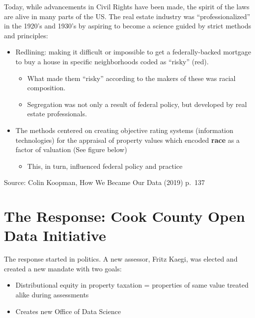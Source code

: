 \documentclass[
  letterpaper,
  DIV=11,
  numbers=noendperiod]{scrreprt}
\providecommand{\tightlist}{%
  \setlength{\itemsep}{0pt}\setlength{\parskip}{0pt}}\usepackage{longtable,booktabs,array}
\begin{document}
Today, while advancements in Civil Rights have been made, the spirit of
the laws are alive in many parts of the US. The real estate industry was
``professionalized'' in the 1920's and 1930's by aspiring to become a
science guided by strict methods and principles:

\begin{itemize}
\tightlist
\item
  Redlining: making it difficult or impossible to get a federally-backed
  mortgage to buy a house in specific neighborhoods coded as ``risky''
  (red).

  \begin{itemize}
  \tightlist
  \item
    What made them ``risky'' according to the makers of these was racial
    composition.
  \item
    Segregation was not only a result of federal policy, but developed
    by real estate professionals.
  \end{itemize}
\item
  The methods centered on creating objective rating systems (information
  technologies) for the appraisal of property values which encoded
  \textbf{race} as a factor of valuation (See figure below)

  \begin{itemize}
  \tightlist
  \item
    This, in turn, influenced federal policy and practice
  \end{itemize}
\end{itemize}

Source: Colin Koopman, How We Became Our Data (2019) p.~137

\hypertarget{the-response-cook-county-open-data-initiative}{%
\section{The Response: Cook County Open Data
Initiative}\label{the-response-cook-county-open-data-initiative}}

The response started in politics. A new assessor, Fritz Kaegi, was
elected and created a new mandate with two goals:

\begin{itemize}
\tightlist
\item
  Distributional equity in property taxation = properties of same value
  treated alike during assessments
\item
  Creates new Office of Data Science
\end{itemize}
\end{document}
